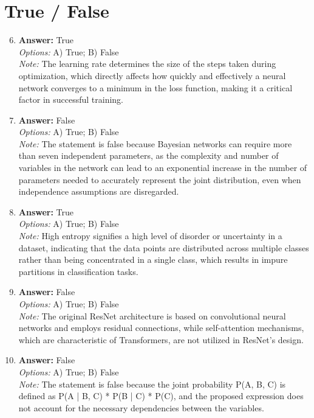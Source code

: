 \documentclass[12pt]{article}
\begin{document}
\section*{True / False}
\begin{enumerate}[label=\arabic*.]
\setcounter{enumi}{5}
\item \textbf{Answer:} True
\\ \textit{Options:} A) True; B) False
\\ \textit{Note:} The learning rate determines the size of the steps taken during optimization, which directly affects how quickly and effectively a neural network converges to a minimum in the loss function, making it a critical factor in successful training.
\item \textbf{Answer:} False
\\ \textit{Options:} A) True; B) False
\\ \textit{Note:} The statement is false because Bayesian networks can require more than seven independent parameters, as the complexity and number of variables in the network can lead to an exponential increase in the number of parameters needed to accurately represent the joint distribution, even when independence assumptions are disregarded.
\item \textbf{Answer:} True
\\ \textit{Options:} A) True; B) False
\\ \textit{Note:} High entropy signifies a high level of disorder or uncertainty in a dataset, indicating that the data points are distributed across multiple classes rather than being concentrated in a single class, which results in impure partitions in classification tasks.
\item \textbf{Answer:} False
\\ \textit{Options:} A) True; B) False
\\ \textit{Note:} The original ResNet architecture is based on convolutional neural networks and employs residual connections, while self-attention mechanisms, which are characteristic of Transformers, are not utilized in ResNet's design.
\item \textbf{Answer:} False
\\ \textit{Options:} A) True; B) False
\\ \textit{Note:} The statement is false because the joint probability P(A, B, C) is defined as P(A | B, C) * P(B | C) * P(C), and the proposed expression does not account for the necessary dependencies between the variables.
\end{enumerate}
\end{document}
